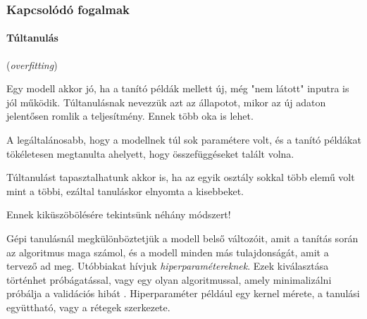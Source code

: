 \subsubsection{Kapcsolódó fogalmak}


\paragraph{Túltanulás} (\textit{overfitting})

%


Egy modell akkor jó, ha a tanító példák mellett új, még "nem látott"
inputra is jól működik. Túltanulásnak nevezzük
azt az állapotot, mikor az új adaton jelentősen romlik a teljesítmény.
Ennek több oka is lehet. 

A legáltalánosabb, hogy a modellnek túl sok paramétere volt, és a tanító példákat tökéletesen megtanulta ahelyett, hogy összefüggéseket talált volna.

Túltanulást tapasztalhatunk akkor is, ha az egyik osztály sokkal több elemű volt mint a többi, ezáltal tanuláskor elnyomta a kisebbeket.

Ennek kiküszöbölésére tekintsünk néhány módszert!



Gépi tanulásnál megkülönböztetjük a modell belső változóit, amit 
a tanítás során az algoritmus maga számol, és a modell minden más tulajdonságát, amit a tervező ad meg. Utóbbiakat hívjuk \textit{hiperparamétereknek}. Ezek kiválasztása történhet próbágatással, vagy egy olyan algoritmussal, amely minimalizálni próbálja a validációs hibát \cite{bergstra2013hyperopt}.  
Hiperparaméter például egy kernel mérete, a tanulási együttható, vagy a rétegek szerkezete.



